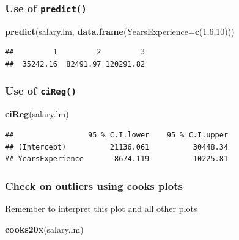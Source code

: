 \documentclass[]{article}
\newenvironment{Shaded}{\begin{snugshade}}{\end{snugshade}}
\newcommand{\DataTypeTok}[1]{\textcolor[rgb]{0.13,0.29,0.53}{#1}}
\newcommand{\DecValTok}[1]{\textcolor[rgb]{0.00,0.00,0.81}{#1}}
\newcommand{\KeywordTok}[1]{\textcolor[rgb]{0.13,0.29,0.53}{\textbf{#1}}}
\newcommand{\NormalTok}[1]{#1}
\begin{document}
\hypertarget{use-of-predict}{%
\subsubsection{\texorpdfstring{Use of
\texttt{predict()}}{Use of predict()}}\label{use-of-predict}}

\begin{Shaded}
\begin{Highlighting}[]
\KeywordTok{predict}\NormalTok{(salary.lm, }\KeywordTok{data.frame}\NormalTok{(}\DataTypeTok{YearsExperience=}\KeywordTok{c}\NormalTok{(}\DecValTok{1}\NormalTok{,}\DecValTok{6}\NormalTok{,}\DecValTok{10}\NormalTok{)))}
\end{Highlighting}
\end{Shaded}

\begin{verbatim}
##         1         2         3 
##  35242.16  82491.97 120291.82
\end{verbatim}

\hypertarget{use-of-cireg}{%
\subsubsection{\texorpdfstring{Use of
\texttt{ciReg()}}{Use of ciReg()}}\label{use-of-cireg}}

\begin{Shaded}
\begin{Highlighting}[]
\KeywordTok{ciReg}\NormalTok{(salary.lm)}
\end{Highlighting}
\end{Shaded}

\begin{verbatim}
##                 95 % C.I.lower    95 % C.I.upper
## (Intercept)          21136.061          30448.34
## YearsExperience       8674.119          10225.81
\end{verbatim}

\hypertarget{check-on-outliers-using-cooks-plots}{%
\subsubsection{Check on outliers using cooks
plots}\label{check-on-outliers-using-cooks-plots}}

Remember to interpret this plot and all other plots

\begin{Shaded}
\begin{Highlighting}[]
\KeywordTok{cooks20x}\NormalTok{(salary.lm)}
\end{Highlighting}
\end{Shaded}
\end{document}
